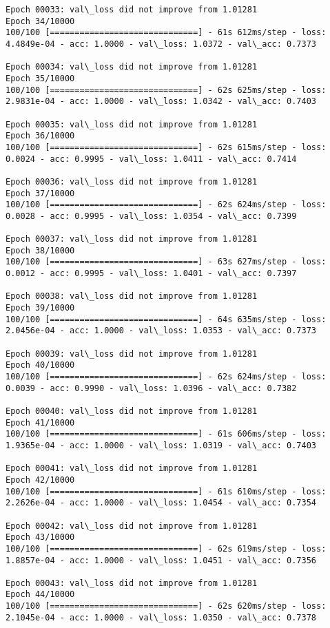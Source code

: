 \documentclass[11pt]{article}
\begin{document}
\begin{Verbatim}[commandchars=\\\{\}]
Epoch 00033: val\_loss did not improve from 1.01281
Epoch 34/10000
100/100 [==============================] - 61s 612ms/step - loss: 4.4849e-04 - acc: 1.0000 - val\_loss: 1.0372 - val\_acc: 0.7373

Epoch 00034: val\_loss did not improve from 1.01281
Epoch 35/10000
100/100 [==============================] - 62s 625ms/step - loss: 2.9831e-04 - acc: 1.0000 - val\_loss: 1.0342 - val\_acc: 0.7403

Epoch 00035: val\_loss did not improve from 1.01281
Epoch 36/10000
100/100 [==============================] - 62s 615ms/step - loss: 0.0024 - acc: 0.9995 - val\_loss: 1.0411 - val\_acc: 0.7414

Epoch 00036: val\_loss did not improve from 1.01281
Epoch 37/10000
100/100 [==============================] - 62s 624ms/step - loss: 0.0028 - acc: 0.9995 - val\_loss: 1.0354 - val\_acc: 0.7399

Epoch 00037: val\_loss did not improve from 1.01281
Epoch 38/10000
100/100 [==============================] - 63s 627ms/step - loss: 0.0012 - acc: 0.9995 - val\_loss: 1.0401 - val\_acc: 0.7397

Epoch 00038: val\_loss did not improve from 1.01281
Epoch 39/10000
100/100 [==============================] - 64s 635ms/step - loss: 2.0456e-04 - acc: 1.0000 - val\_loss: 1.0353 - val\_acc: 0.7373

Epoch 00039: val\_loss did not improve from 1.01281
Epoch 40/10000
100/100 [==============================] - 62s 624ms/step - loss: 0.0039 - acc: 0.9990 - val\_loss: 1.0396 - val\_acc: 0.7382

Epoch 00040: val\_loss did not improve from 1.01281
Epoch 41/10000
100/100 [==============================] - 61s 606ms/step - loss: 1.9365e-04 - acc: 1.0000 - val\_loss: 1.0319 - val\_acc: 0.7403

Epoch 00041: val\_loss did not improve from 1.01281
Epoch 42/10000
100/100 [==============================] - 61s 610ms/step - loss: 2.2626e-04 - acc: 1.0000 - val\_loss: 1.0454 - val\_acc: 0.7354

Epoch 00042: val\_loss did not improve from 1.01281
Epoch 43/10000
100/100 [==============================] - 62s 619ms/step - loss: 1.8857e-04 - acc: 1.0000 - val\_loss: 1.0451 - val\_acc: 0.7356

Epoch 00043: val\_loss did not improve from 1.01281
Epoch 44/10000
100/100 [==============================] - 62s 620ms/step - loss: 2.1045e-04 - acc: 1.0000 - val\_loss: 1.0350 - val\_acc: 0.7378


\end{Verbatim}
\end{document}
